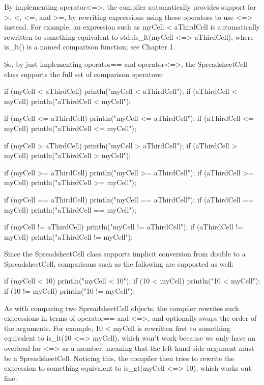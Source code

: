 By implementing operator<=>, the compiler automatically provides support for >, <, <=, and >=, by rewriting expressions using those operators to use <=> instead. For example, an expression such as myCell < aThirdCell is automatically rewritten to something equivalent to std::is\_lt(myCell <=> aThirdCell), where is\_lt() is a named comparison function; see Chapter 1.

So, by just implementing operator== and operator<=>, the SpreadsheetCell class supports the full set of comparison operators:

\begin{cpp}
if (myCell < aThirdCell) { println("myCell < aThirdCell"); }
if (aThirdCell < myCell) { println("aThirdCell < myCell"); }

if (myCell <= aThirdCell) { println("myCell <= aThirdCell"); }
if (aThirdCell <= myCell) { println("aThirdCell <= myCell"); }

if (myCell > aThirdCell) { println("myCell > aThirdCell"); }
if (aThirdCell > myCell) { println("aThirdCell > myCell"); }

if (myCell >= aThirdCell) { println("myCell >= aThirdCell"); }
if (aThirdCell >= myCell) { println("aThirdCell >= myCell"); }

if (myCell == aThirdCell) { println("myCell == aThirdCell"); }
if (aThirdCell == myCell) { println("aThirdCell == myCell"); }

if (myCell != aThirdCell) { println("myCell != aThirdCell"); }
if (aThirdCell != myCell) { println("aThirdCell != myCell"); }
\end{cpp}

Since the SpreadsheetCell class supports implicit conversion from double to a SpreadsheetCell, comparisons such as the following are supported as well:

\begin{cpp}
if (myCell < 10) { println("myCell < 10"); }
if (10 < myCell) { println("10 < myCell"); }
if (10 != myCell) { println("10 != myCell"); }
\end{cpp}

As with comparing two SpreadsheetCell objects, the compiler rewrites such expressions in terms of operator== and <=>, and optionally swaps the order of the arguments. For example, 10 < myCell is rewritten first to something equivalent to is\_lt(10 <=> myCell), which won’t work because we only have an overload for <=> as a member, meaning that the left-hand side argument must be a SpreadsheetCell. Noticing this, the compiler then tries to rewrite the expression to something equivalent to is\_gt(myCell <=> 10), which works out fine.

